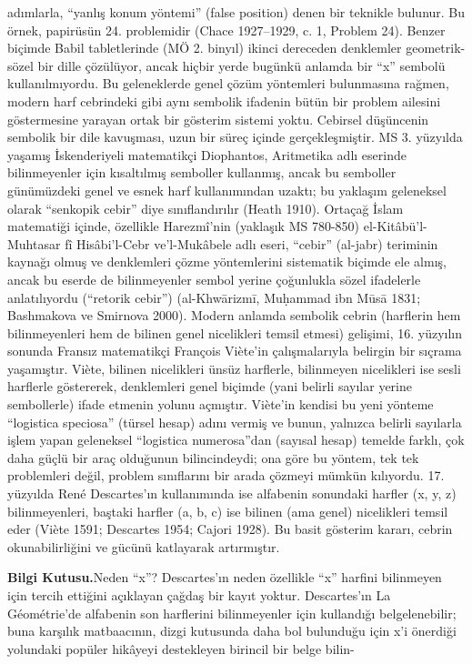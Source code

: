 adımlarla, “yanlış konum yöntemi” (false position) denen bir teknikle bulunur. Bu örnek, papirüsün 24. problemidir (Chace 1927–1929, c. 1, Problem 24). Benzer biçimde Babil tabletlerinde (MÖ 2. binyıl) ikinci dereceden denklemler geometrik-sözel bir dille çözülüyor, ancak hiçbir yerde bugünkü anlamda bir “x” sembolü kullanılmıyordu. Bu geleneklerde genel çözüm yöntemleri bulunmasına rağmen, modern harf cebrindeki gibi aynı sembolik ifadenin bütün bir problem ailesini göstermesine yarayan ortak bir gösterim sistemi yoktu. Cebirsel düşüncenin sembolik bir dile kavuşması, uzun bir süreç içinde gerçekleşmiştir. MS 3. yüzyılda yaşamış İskenderiyeli matematikçi Diophantos, Aritmetika adlı eserinde bilinmeyenler için kısaltılmış semboller kullanmış, ancak bu semboller günümüzdeki genel ve esnek harf kullanımından uzaktı; bu yaklaşım geleneksel olarak “senkopik cebir” diye sınıflandırılır (Heath 1910). Ortaçağ İslam matematiği içinde, özellikle Harezmî’nin (yaklaşık MS 780-850) el-Kitâbü’l-Muhtasar fî Hisâbi’l-Cebr ve’l-Mukâbele adlı eseri, “cebir” (al-jabr) teriminin kaynağı olmuş ve denklemleri çözme yöntemlerini sistematik biçimde ele almış, ancak bu eserde de bilinmeyenler sembol yerine çoğunlukla sözel ifadelerle anlatılıyordu (“retorik cebir”) (al-Khwārizmī, Muḥammad ibn Mūsā 1831; Bashmakova ve Smirnova 2000). Modern anlamda sembolik cebrin (harflerin hem bilinmeyenleri hem de bilinen genel nicelikleri temsil etmesi) gelişimi, 16. yüzyılın sonunda Fransız matematikçi François Viète’in çalışmalarıyla belirgin bir sıçrama yaşamıştır. Viète, bilinen nicelikleri ünsüz harflerle, bilinmeyen nicelikleri ise sesli harflerle göstererek, denklemleri genel biçimde (yani belirli sayılar yerine sembollerle) ifade etmenin yolunu açmıştır. Viète’in kendisi bu yeni yönteme “logistica speciosa” (türsel hesap) adını vermiş ve bunun, yalnızca belirli sayılarla işlem yapan geleneksel “logistica numerosa”dan (sayısal hesap) temelde farklı, çok daha güçlü bir araç olduğunun bilincindeydi; ona göre bu yöntem, tek tek problemleri değil, problem sınıflarını bir arada çözmeyi mümkün kılıyordu. 17. yüzyılda René Descartes’ın kullanımında ise alfabenin sonundaki harfler (x, y, z) bilinmeyenleri, baştaki harfler (a, b, c) ise bilinen (ama genel) nicelikleri temsil eder (Viète 1591; Descartes 1954; Cajori 1928). Bu basit gösterim kararı, cebrin okunabilirliğini ve gücünü katlayarak artırmıştır.

\begin{tcolorbox}[bookbox,colback=cEx]\textbf{\textsf{\textcolor{cAcc}{Bilgi Kutusu.}}}\quad Neden “x”? Descartes’ın neden özellikle “x” harfini bilinmeyen için tercih ettiğini açıklayan çağdaş bir kayıt yoktur. Descartes’ın La Géométrie’de alfabenin son harflerini bilinmeyenler için kullandığı belgelenebilir; buna karşılık matbaacının, dizgi kutusunda daha bol bulunduğu için x’i önerdiği yolundaki popüler hikâyeyi destekleyen birincil bir belge bilin-\end{tcolorbox}

